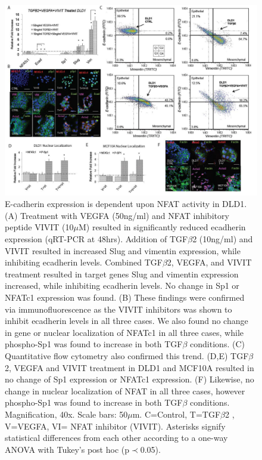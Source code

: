 \begin{figure}
\includegraphics [width=1.0\linewidth] {./figs/Fig-4-Supplemental-DLD1-FlowCyto.pdf}
\caption{E-cadherin expression is dependent upon NFAT activity in DLD1.
(A) Treatment with VEGFA (50ng/ml) and NFAT inhibitory peptide VIVIT (10$\mu$M) resulted in significantly reduced ecadherin expression (qRT-PCR at 48hrs).
Addition of TGF$\beta$2 (10ng/ml) and VIVIT resulted in increased Slug and vimentin expression, while inhibiting ecadherin levels.
Combined TGF$\beta$2, VEGFA, and VIVIT treatment resulted in target genes Slug and vimentin expression increased, while inhibiting ecadherin levels.
No change in Sp1 or NFATc1 expression was found.
(B) These findings were confirmed via immunofluorescence as the VIVIT inhibitors was shown to inhibit ecadherin levels in all three cases.
We also found no change in gene or nuclear localization of NFATc1 in all three cases, while phospho-Sp1 was found to increase in both TGF$\beta$ conditions.
(C) Quantitative flow cytometry also confirmed this trend.
(D,E)  TGF$\beta$2, VEGFA and VIVIT treatment in DLD1 and MCF10A resulted in no change of Sp1 expression or NFATc1 expression.
(F)  Likewise, no change in nuclear localization of NFAT in all three cases, however phospho-Sp1 was found to increase in both TGF$\beta$ conditions.
Magnification, 40x. Scale bars: 50$\mu$m.  C=Control, T=TGF$\beta$2 , V=VEGFA, VI= NFAT inhibitor (VIVIT).
Asterisks signify statistical differences from each other according to a one-way ANOVA with Tukey's post hoc (p$\prec$0.05).}\label{fg:S4}
\end{figure}

